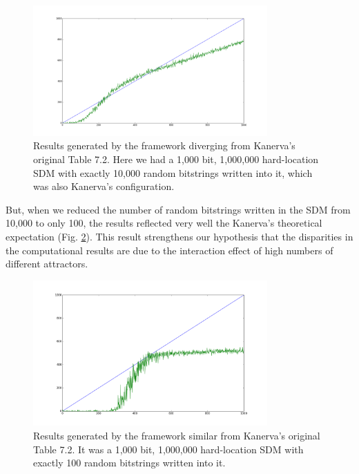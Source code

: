 \begin{figure}[h]
\centering\includegraphics[width=0.8\textwidth]{images02/sdm-10000w-table-7-2.png}
\caption{Results generated by the framework diverging from Kanerva's original Table 7.2. Here we had a 1,000 bit, 1,000,000 hard-location SDM with exactly 10,000 random bitstrings written into it, which was also Kanerva's configuration.
\label{sdm-10000w-table-7-2}}
\end{figure}

But, when we reduced the number of random bitstrings written in the SDM from 10,000 to only 100, the results reflected very well the Kanerva's theoretical expectation (Fig. \ref{sdm-100w-table-7-2}). This result strengthens our hypothesis that the disparities in the computational results are due to the interaction effect of high numbers of different attractors.

\begin{figure}[h]
\centering\includegraphics[width=0.8\textwidth]{images02/sdm-100w-table-7-2.png}
\caption{Results generated by the framework similar from Kanerva's original Table 7.2. It was a 1,000 bit, 1,000,000 hard-location SDM with exactly 100 random bitstrings written into it.
\label{sdm-100w-table-7-2}}
\end{figure}

